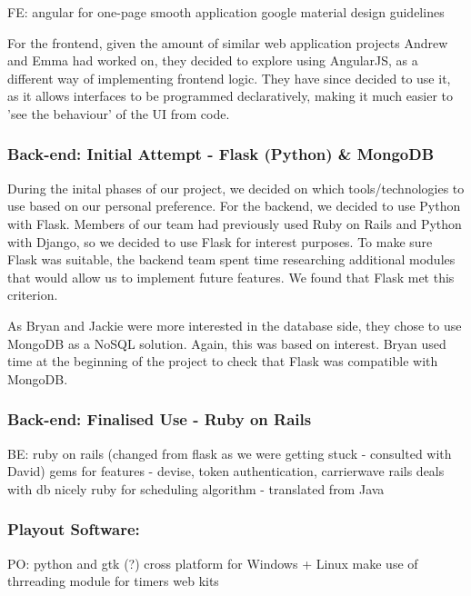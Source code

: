 ﻿\documentclass[a4paper, titlepage]{article}
\begin{document}
FE: 
  angular for one-page smooth application
  google material design guidelines

For the frontend, given the amount of similar web application projects Andrew and Emma had worked on, they decided to explore using AngularJS, as a different way of implementing frontend logic. They have since decided to use it, as it allows interfaces to be programmed declaratively, making it much easier to 'see the behaviour' of the UI from code.


\subsubsection{Back-end: Initial Attempt - Flask (Python) \& MongoDB}

During the inital phases of our project, we decided on which tools/technologies to use based on our personal preference. For the backend, we decided to use Python with Flask. Members of our team had previously used Ruby on Rails and Python with Django, so we decided to use Flask for interest purposes. To make sure Flask was suitable, the backend team spent time researching additional modules that would allow us to implement future features. We found that Flask met this criterion.

As Bryan and Jackie were more interested in the database side, they chose to use MongoDB as a NoSQL solution. Again, this was based on interest. Bryan used time at the beginning of the project to check that Flask was compatible with MongoDB. 



\subsubsection{Back-end: Finalised Use - Ruby on Rails}

BE: 
  ruby on rails (changed from flask as we were getting stuck - consulted with David)
  gems for features - devise, token authentication, carrierwave
  rails deals with db nicely
  ruby for scheduling algorithm - translated from Java
  

\subsubsection{Playout Software: }

PO: 
  python and gtk (?)
  cross platform for Windows + Linux
  make use of thrreading module for timers
  web kits
\end{document}
